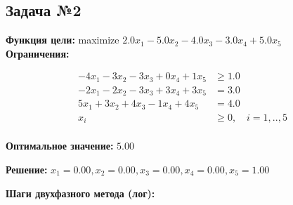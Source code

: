 \documentclass[a4paper,12pt]{article}
\begin{document}
\subsection*{Задача №2}
\textbf{Функция цели: }
maximize $ 2.0x_{1} -5.0x_{2} -4.0x_{3} -3.0x_{4} +5.0x_{5} $\\

\textbf{Ограничения:}

\[ \begin{aligned}
-4x_{1} -3x_{2} -3x_{3} +0x_{4} +1x_{5} &\ge 1.0 \\
-2x_{1} -2x_{2} -3x_{3} +3x_{4} +3x_{5} &= 3.0 \\
5x_{1} +3x_{2} +4x_{3} -1x_{4} +4x_{5} &= 4.0 \\
x_i &\ge 0,\quad i=1,..,5\\
\end{aligned}\]

\textbf{Оптимальное значение: }$5.00$

\textbf{Решение: }$x_{1}=0.00, x_{2}=0.00, x_{3}=0.00, x_{4}=0.00, x_{5}=1.00$

\textbf{Шаги двухфазного метода (лог):}
\end{document}
